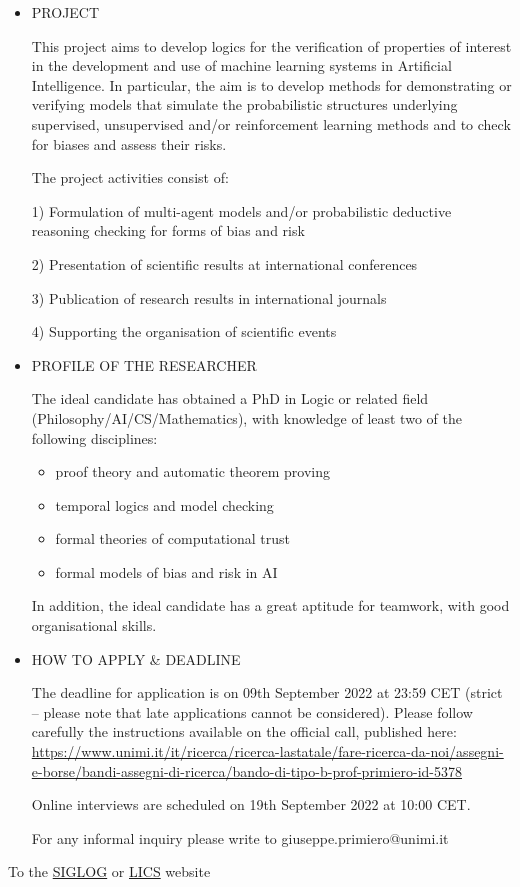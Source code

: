 \documentclass[prodmode,acmtecs]{acmsmall} %
\begin{document}
\begin{itemize}\item  PROJECT 
 
  This project aims to develop logics for the verification of properties of interest in the development and use of machine learning systems in Artificial Intelligence. In particular, the aim is to develop methods for demonstrating or verifying models that simulate the probabilistic structures underlying supervised, unsupervised and/or reinforcement learning methods and to check for biases and assess their risks. 
 
  The project activities consist of: 
 
  1) Formulation of multi-agent models and/or probabilistic deductive reasoning checking for forms of bias and risk 
 
  2) Presentation of scientific results at international conferences 
 
  3) Publication of research results in international journals 
 
  4) Supporting the organisation of scientific events 
 
\item  PROFILE OF THE RESEARCHER 
 
  The ideal candidate has obtained a PhD in Logic or related field (Philosophy/AI/CS/Mathematics), with knowledge of least two of the following disciplines: 
 
\begin{itemize}\item  proof theory and automatic theorem proving
\item  temporal logics and model checking
\item  formal theories of computational trust
\item  formal models of bias and risk in AI
\end{itemize} 
  In addition, the ideal candidate has a great aptitude for teamwork, with good organisational skills. 
 
\item  HOW TO APPLY \& DEADLINE 
 
  The deadline for application is on 09th September 2022 at 23:59 CET (strict – please note that late applications cannot be considered). Please follow carefully the instructions available on the official call, published here: \href{https://www.unimi.it/it/ricerca/ricerca-lastatale/fare-ricerca-da-noi/assegni-e-borse/bandi-assegni-di-ricerca/bando-di-tipo-b-prof-primiero-id-5378}{https://www.unimi.it/it/ricerca/ricerca-lastatale/fare-ricerca-da-noi/assegni-e-borse/bandi-assegni-di-ricerca/bando-di-tipo-b-prof-primiero-id-5378} 
 
  Online interviews are scheduled on 19th September 2022 at 10:00 CET. 
 
  For any informal inquiry please write to giuseppe.primiero@unimi.it  
 
\end{itemize}


To the \href{http://siglog.org/}{SIGLOG} or \href{https://lics.siglog.org}{LICS} website
\end{document}
